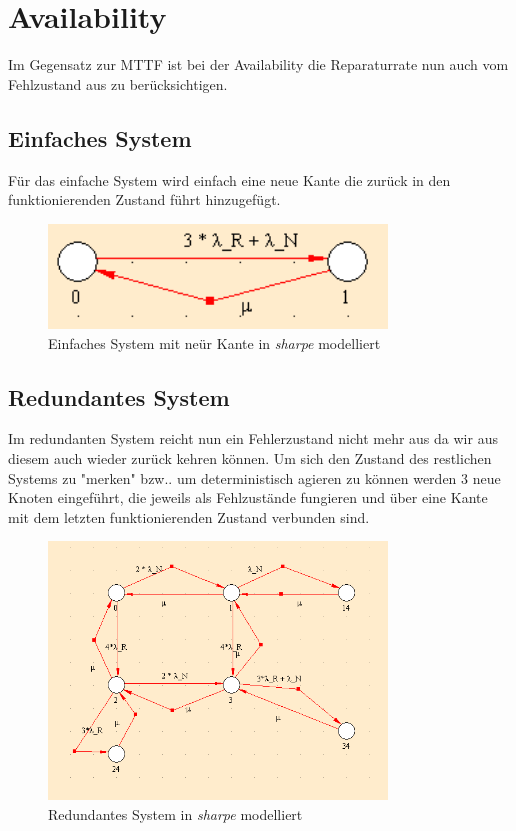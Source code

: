 \documentclass[10pt,a4paper]{article}
\begin{document}
\section{Availability}
\label{sec:avail}
Im Gegensatz zur MTTF ist bei der Availability die Reparaturrate nun auch vom Fehlzustand aus zu berücksichtigen.
\subsection{Einfaches System}
Für das einfache System wird einfach eine neue Kante die zurück in den funktionierenden Zustand führt hinzugefügt.
\begin{figure}[ht!]
\centering
\includegraphics[width=90mm]{AVAILABILITY_Einfach.png}
\caption{Einfaches System mit neür Kante in \textit{sharpe} modelliert \label{avail_einfach}}
\end{figure}

\newpage
\subsection{Redundantes System}
Im redundanten System reicht nun ein Fehlerzustand nicht mehr aus da wir aus diesem auch wieder zurück kehren können. Um sich den Zustand des restlichen Systems zu "merken" bzw.. um deterministisch agieren zu können werden 3 neue Knoten eingeführt, die jeweils als Fehlzustände fungieren und über eine Kante mit dem letzten funktionierenden Zustand verbunden sind. 
\begin{figure}[ht!]
\centering
\includegraphics[width=90mm]{AVAILABILITY_RED.png}
\caption{Redundantes System in \textit{sharpe} modelliert \label{avail_einfach}}
\end{figure}

\newpage
\end{document}
